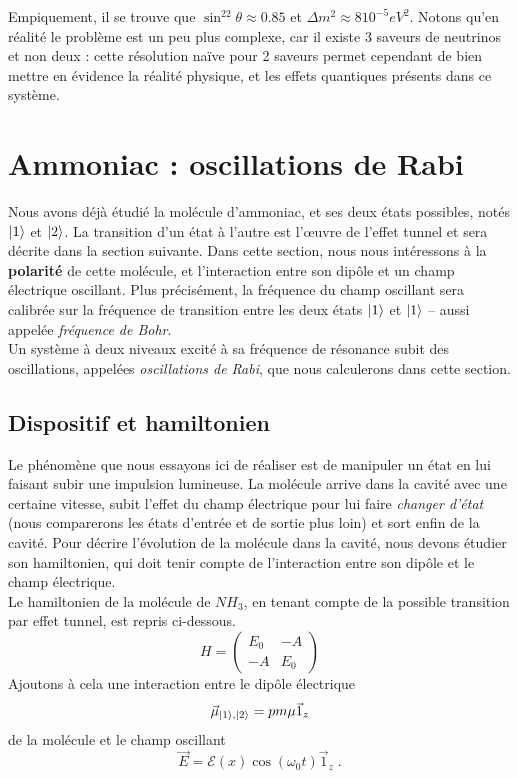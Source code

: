 \documentclass[../notesdecours.tex]{subfiles}
\begin{document}
Empiquement, il se trouve que $\sin^22\theta \approx 0.85$ et $\Delta m^2 \approx 8 10^{-5} eV^2$. \color{purple} Notons qu'en réalité le problème est un peu plus complexe, car il existe 3 saveurs de neutrinos et non deux : cette résolution naïve pour 2 saveurs permet cependant de bien mettre en évidence la réalité physique, et les effets quantiques présents dans ce système. \color{black}

\section{Ammoniac : oscillations de Rabi}
Nous avons déjà étudié la molécule d'ammoniac, et ses deux états possibles, notés $\ket 1$ et $\ket 2$. La transition d'un état à l'autre est l'œuvre de l'effet tunnel et sera décrite dans la section suivante. Dans cette section, nous nous intéressons à la \textbf{polarité} de cette molécule, et l'interaction entre son dipôle et un champ électrique oscillant. Plus précisément, la fréquence du champ oscillant sera calibrée sur la fréquence de transition entre les deux états $\ket 1$ et $\ket 1$ -- aussi appelée \textit{fréquence de Bohr}. \\

Un système à deux niveaux excité à sa fréquence de résonance subit des oscillations, appelées \textit{oscillations de Rabi}, que nous calculerons dans cette section. 

\subsection{Dispositif et hamiltonien}
Le phénomène que nous essayons ici de réaliser est de manipuler un état en lui faisant subir une impulsion lumineuse. La molécule arrive dans la cavité avec une certaine vitesse, subit l'effet du champ électrique pour lui faire \textit{changer d'état} (nous comparerons les états d'entrée et de sortie plus loin) et sort enfin de la cavité. Pour décrire l'évolution de la molécule dans la cavité, nous devons étudier son hamiltonien, qui doit tenir compte de l'interaction entre son dipôle et le champ électrique. \\

Le hamiltonien de la molécule de $NH_3$, en tenant compte de la possible transition par effet tunnel, est repris ci-dessous.
\begin{equation}
    H = 
    \begin{pmatrix}
        E_0 & -A\\
        -A & E_0
    \end{pmatrix}\label{eq:chap5-rabi-hamiltonien}
\end{equation}
Ajoutons à cela une interaction entre le dipôle électrique $$\vec \mu_{\ket 1, \ket 2} = pm\mu \vec 1_z$$ de la molécule et le champ oscillant $$\vec E = \mathcal{E}(x)\cos(\omega_0 t)\vec 1_z \; .$$
\end{document}
